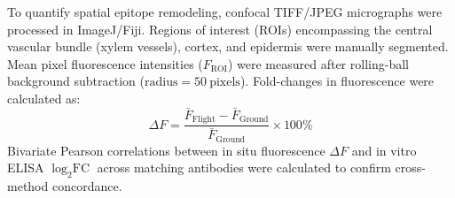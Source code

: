 To quantify spatial epitope remodeling, confocal TIFF/JPEG micrographs were processed in ImageJ/Fiji. Regions of interest (ROIs) encompassing the central vascular bundle (xylem vessels), cortex, and epidermis were manually segmented. Mean pixel fluorescence intensities ($F_{\text{ROI}}$) were measured after rolling-ball background subtraction ($\text{radius} = 50~\text{pixels}$). Fold-changes in fluorescence were calculated as:
\begin{equation}
    \Delta F = \frac{\bar{F}_{\text{Flight}} - \bar{F}_{\text{Ground}}}{\bar{F}_{\text{Ground}}} \times 100\%
\end{equation}
Bivariate Pearson correlations between in situ fluorescence $\Delta F$ and in vitro ELISA $\log_2\text{FC}$ across matching antibodies were calculated to confirm cross-method concordance.
